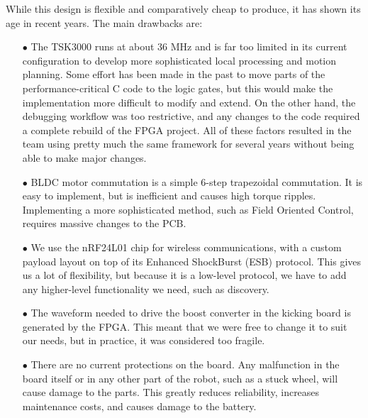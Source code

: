 \documentclass[runningheads]{llncs}
\begin{document}
While this design is flexible and comparatively cheap to produce, it has shown its age in recent years. The main drawbacks are:
\begin{enumerate}
    \item[$\bullet$] The TSK3000 runs at about 36 MHz and is far too limited in its current configuration to develop more sophisticated local processing and motion planning. Some effort has been made in the past to move parts of the performance-critical C code to the logic gates, but this would make the implementation more difficult to modify and extend. On the other hand, the debugging workflow was too restrictive, and any changes to the code required a complete rebuild of the FPGA project. All of these factors resulted in the team using pretty much the same framework for several years without being able to make major changes.
    \item[$\bullet$] BLDC motor commutation is a simple 6-step trapezoidal commutation. It is easy to implement, but is inefficient and causes high torque ripples. Implementing a more sophisticated method, such as Field Oriented Control, requires massive changes to the PCB.
    \item[$\bullet$] We use the nRF24L01 chip for wireless communications, with a custom payload layout on top of its Enhanced ShockBurst (ESB) protocol. This gives us a lot of flexibility, but because it is a low-level protocol, we have to add any higher-level functionality we need, such as discovery.
    \item[$\bullet$] The waveform needed to drive the boost converter in the kicking board is generated by the FPGA. This meant that we were free to change it to suit our needs, but in practice, it was considered too fragile.
    \item[$\bullet$] There are no current protections on the board. Any malfunction in the board itself or in any other part of the robot, such as a stuck wheel, will cause damage to the parts. This greatly reduces reliability, increases maintenance costs, and causes damage to the battery.
\end{enumerate}
\end{document}
